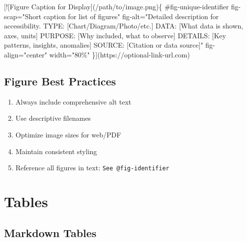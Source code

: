 \documentclass[
  11pt,
  letterpaper,
]{book}
\newenvironment{Shaded}{\begin{snugshade}}{\end{snugshade}}
\newcommand{\CommentTok}[1]{\textcolor[rgb]{0.37,0.37,0.37}{#1}}
\newcommand{\NormalTok}[1]{\textcolor[rgb]{0.00,0.23,0.31}{#1}}
\newcommand{\OtherTok}[1]{\textcolor[rgb]{0.00,0.23,0.31}{#1}}
\providecommand{\tightlist}{%
  \setlength{\itemsep}{0pt}\setlength{\parskip}{0pt}}
\begin{document}
\begin{Shaded}
\begin{Highlighting}[]
\CommentTok{[}\OtherTok{![Figure Caption for Display}\CommentTok{](/path/to/image.png)}\NormalTok{\{}
\NormalTok{  \#fig{-}unique{-}identifier}
\NormalTok{  fig{-}scap="Short caption for list of figures"}
\NormalTok{  fig{-}alt="Detailed description for accessibility.}
\NormalTok{          TYPE: }\CommentTok{[}\OtherTok{Chart/Diagram/Photo/etc.}\CommentTok{]}
\NormalTok{          DATA: }\CommentTok{[}\OtherTok{What data is shown, axes, units}\CommentTok{]}
\NormalTok{          PURPOSE: }\CommentTok{[}\OtherTok{Why included, what to observe}\CommentTok{]}
\NormalTok{          DETAILS: }\CommentTok{[}\OtherTok{Key patterns, insights, anomalies}\CommentTok{]}
\NormalTok{          SOURCE: }\CommentTok{[}\OtherTok{Citation or data source}\CommentTok{]}\NormalTok{"}
\NormalTok{  fig{-}align="center"}
\NormalTok{  width="80\%"}
\NormalTok{\}](https://optional{-}link{-}url.com)}
\end{Highlighting}
\end{Shaded}

\subsection*{Figure Best Practices}\label{figure-best-practices}

\begin{enumerate}
\def\labelenumi{\arabic{enumi}.}
\tightlist
\item
  Always include comprehensive alt text
\item
  Use descriptive filenames
\item
  Optimize image sizes for web/PDF
\item
  Maintain consistent styling
\item
  Reference all figures in text: \texttt{See\ @fig-identifier}
\end{enumerate}

\section*{Tables}\label{tables}


\subsection*{Markdown Tables}\label{markdown-tables}
\end{document}
